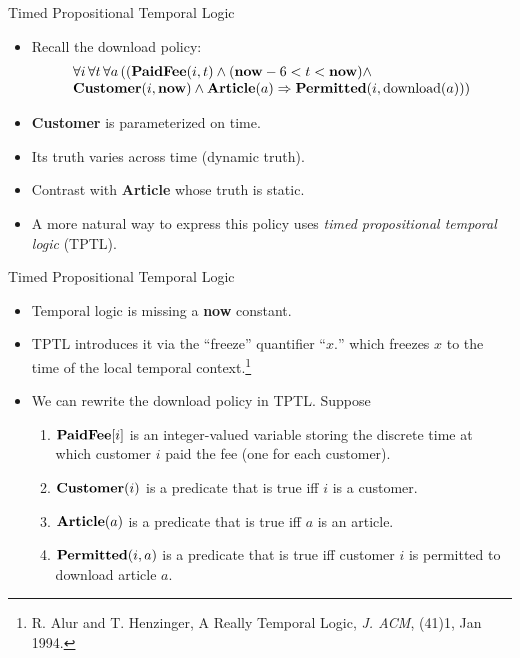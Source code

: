 \begin{wideslide}[bm=,toc=]{Timed Propositional Temporal Logic}
\begin{itemize}
\item Recall the download policy:
\begin{displaymath}
\begin{array}{l}
\forall i\, \forall t\, \forall a\, ((\mbox{\bf PaidFee}(i,t)\wedge (\mbox{\bf now} - 6 < t < \mbox{\bf now})\wedge \\
\mbox{\bf Customer}(i,\mbox{\bf now})\wedge\mbox{\bf Article}(a) \Rightarrow \mbox{\bf Permitted}(i,\mbox{\rm download}(a)))
\end{array}
\end{displaymath}
\item {\bf Customer} is parameterized on time.
\item Its truth varies across time (dynamic truth).
\item Contrast with {\bf Article} whose truth is static.
\item A more natural way to express this policy uses {\em timed propositional temporal logic\/} (TPTL).
\end{itemize}
\end{wideslide}

\begin{wideslide}[bm=,toc=]{Timed Propositional Temporal Logic}
\begin{itemize}
\item Temporal logic is missing a {\bf now} constant.
\item TPTL introduces it via the ``freeze'' quantifier ``$x.$'' which freezes $x$ to the
time of the local temporal context.\footnote{
R. Alur and T. Henzinger, A Really Temporal Logic, {\em J. ACM\/},
(41)1, Jan 1994.}
\item We can rewrite the download policy in TPTL.  Suppose
\begin{enumerate}
\item $\mbox{\bf PaidFee}[i]$ is an integer-valued variable storing
the discrete time at which customer $i$ paid the fee (one for each customer).
\item $\mbox{\bf Customer}(i)$ is a predicate that is true iff $i$ is a customer.
\item $\mbox{\bf Article}(a)$ is a predicate that is true iff $a$ is an article.
\item $\mbox{\bf Permitted}(i,a)$ is a predicate that is true iff 
customer $i$ is permitted to download article $a$.
\end{enumerate}
\end{itemize}
\end{wideslide}

